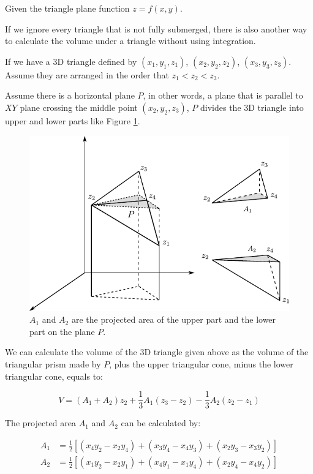 Given the triangle plane function $z=f(x,y)$.

If we ignore every triangle that is not fully submerged, there is also another way to calculate the volume under a triangle without using integration.

If we have a 3D triangle defined by $(x_1,y_1,z_1)$, $(x_2,y_2,z_2)$, $(x_3,y_3,z_3)$. Assume they are arranged in the order that $z_1<z_2<z_3$.

Assume there is a horizontal plane $P$, in other words, a plane that is parallel to $XY$ plane crossing the middle point $(x_2,y_2,z_3)$, $P$ divides the 3D triangle into upper and lower parts like Figure \ref{fig:04triangle-volume}.

\begin{figure}[ht]
    \centering
    \includegraphics[width=.8\textwidth]{images/04triangle-volume.pdf}
    \caption{$A_1$ and $A_2$ are the projected area of the upper part and the lower part on the plane $P$.}
    \label{fig:04triangle-volume}
\end{figure}

We can calculate the volume of the 3D triangle given above as the volume of the triangular prism made by $P$, plus the upper triangular cone, minus the lower triangular cone, equals to:

\begin{equation}
    V=(A_1+A_2)z_2+\frac{1}{3}A_1(z_3-z_2)-\frac{1}{3}A_2(z_2-z_1)
\end{equation}

The projected area $A_1$ and $A_2$ can be calculated by:

\begin{align}
    A_1  & =  \frac{1}{2}[(x_4y_2-x_2y_4)+(x_3y_4-x_4y_3)+(x_2y_3-x_3y_2)] \\
    A_2  & =  \frac{1}{2}[(x_1y_2-x_2y_1)+(x_4y_1-x_1y_4)+(x_2y_4-x_4y_2)]
\end{align}

